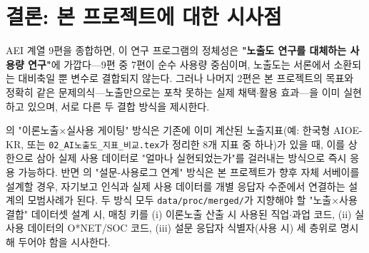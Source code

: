 \documentclass[11pt]{article}
\begin{document}
\section{결론: 본 프로젝트에 대한 시사점}
\label{sec:conclusion}

AEI 계열 9편을 종합하면, 이 연구 프로그램의 정체성은 \textbf{"노출도 연구를 대체하는 사용량 연구"}에 가깝다—9편 중 7편이 순수 사용량 중심이며, 노출도는 서론에서 소환되는 대비축일 뿐 변수로 결합되지 않는다. 그러나 나머지 2편은 본 프로젝트의 목표와 정확히 같은 문제의식—노출만으로는 포착 못하는 실제 채택$\cdot$활용 효과—을 이미 실현하고 있으며, 서로 다른 두 결합 방식을 제시한다.

\citet{massenkoff-2026-labor-market-impacts-of-ai}의 "이론노출$\times$실사용 게이팅" 방식은 기존에 이미 계산된 노출지표(예: 한국형 AIOE-KR, 또는 \texttt{02\_AI노출도\_지표\_비교.tex}가 정리한 8개 지표 중 하나)가 있을 때, 이를 상한으로 삼아 실제 사용 데이터로 "얼마나 실현되었는가"를 걸러내는 방식으로 즉시 응용 가능하다. 반면 \citet{massenkoff-2026-cadences}의 "설문-사용로그 연계" 방식은 본 프로젝트가 향후 자체 서베이를 설계할 경우, 자기보고 인식과 실제 사용 데이터를 개별 응답자 수준에서 연결하는 설계의 모범사례가 된다. 두 방식 모두 \texttt{data/proc/merged/}가 지향해야 할 "노출$\times$사용 결합" 데이터셋 설계 시, 매칭 키를 (i) 이론노출 산출 시 사용된 직업$\cdot$과업 코드, (ii) 실사용 데이터의 O*NET/SOC 코드, (iii) 설문 응답자 식별자(사용 시) 세 층위로 명시해 두어야 함을 시사한다.

\printbibliography[title={참고문헌}]
\end{document}
